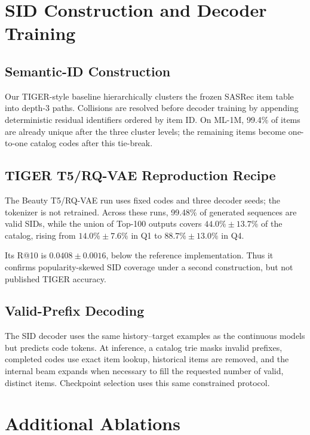 \documentclass[preprint,12pt]{elsarticle}
\begin{document}
\section{SID Construction and Decoder Training}
\label{app:sid}

\subsection{Semantic-ID Construction}
\label{app:sid_construction}

Our TIGER-style baseline hierarchically clusters the frozen SASRec item table
into depth-3 paths. Collisions are resolved before decoder training by
appending deterministic residual identifiers ordered by item ID. On ML-1M,
99.4\% of items are already unique after the three cluster levels; the
remaining items become one-to-one catalog codes after this tie-break.

\subsection{TIGER T5/RQ-VAE Reproduction Recipe}
\label{app:tiger_recipe}

The Beauty T5/RQ-VAE run uses fixed codes and three decoder seeds; the
tokenizer is not retrained.
Across these runs, 99.48\% of generated sequences are valid SIDs, while the
union of Top-100 outputs covers \(44.0\%\pm13.7\%\) of the catalog, rising
from \(14.0\%\pm7.6\%\) in Q1 to \(88.7\%\pm13.0\%\) in Q4.

Its R@10 is \(0.0408\pm0.0016\), below the reference implementation. Thus it
confirms popularity-skewed SID coverage under a second construction, but not
published TIGER accuracy.

\subsection{Valid-Prefix Decoding}
\label{app:tiger_dataloader}

The SID decoder uses the same history--target examples as the continuous
models but predicts code tokens. At inference, a catalog trie masks invalid
prefixes, completed codes use exact item lookup, historical items are removed,
and the internal beam expands when necessary to fill the requested number of
valid, distinct items. Checkpoint selection uses this same constrained
protocol.

\section{Additional Ablations}
\label{app:ablations}
\end{document}
